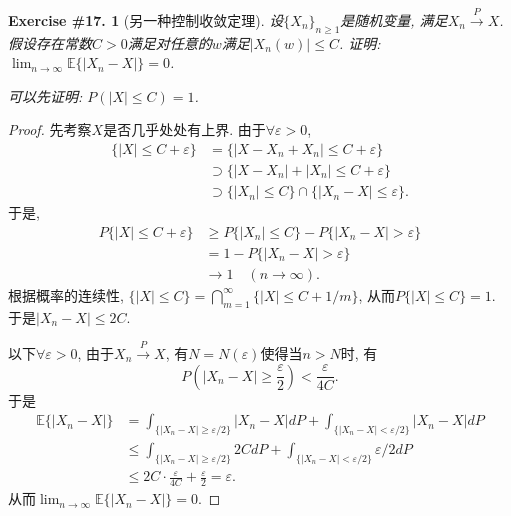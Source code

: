 \documentclass[UTF8, a4paper]{article}
\newtheorem{exercise}{Exercise \#17.}
\begin{document}
\begin{framed}
\begin{exercise}[另一种控制收敛定理]
设\(\{X_n\}_{n\geq 1}\)是随机变量, 满足\(X_n \overset{P}{\to} X\).
假设存在常数\(C>0\)满足对任意的\(w\)满足\(|X_n(w)| \leq C\).
证明: \(\lim_{n\to\infty} \mathbb{E}\{|X_n - X|\} = 0\).

可以先证明: \(P(|X| \leq C) = 1\).
\end{exercise}
\end{framed}



\begin{proof}
先考察\(X\)是否几乎处处有上界. 由于\(\forall \varepsilon > 0\),
$$
\begin{aligned}
    \{|X| \leq C + \varepsilon\} &= \{|X-X_n +X_n| \leq  C + \varepsilon\} \\
    &\supset \{|X-X_n| + |X_n| \leq C + \varepsilon\} \\
    &\supset \{|X_n| \leq C\} \cap \{|X_n - X| \leq \varepsilon\}.
\end{aligned}
$$
于是, 
\begin{align*}
    P\{|X| \leq C + \varepsilon\} &\geq P\{|X_n| \leq C\} - P\{|X_n - X| > \varepsilon\} \\
    & = 1 - P\{|X_n - X| > \varepsilon\} \\
    &\to 1 \quad (n\to \infty).
\end{align*}
根据概率的连续性, \(\{|X| \leq C\} = \bigcap_{m = 1}^\infty \{|X| \leq C + 1/m\}\), 从而\(P\{|X| \leq C\} = 1\). 于是\(|X_n - X| \leq 2C\).

以下\(\forall \varepsilon > 0\), 由于\(X_n \overset{P}{\to} X\), 有\(N = N(\varepsilon)\)使得当\(n > N\)时, 有
$$
P\left(|X_n - X| \geq \frac{\varepsilon}{2}\right) < \frac{\varepsilon}{4C}.
$$
于是
$$
\begin{aligned}
    \mathbb{E}\{|X_n - X|\} &= \int_{\{|X_n - X| \geq \varepsilon/2\}} |X_n - X| dP + \int_{\{|X_n - X| < \varepsilon/2\}} |X_n - X| dP \\
    &\leq \int_{\{|X_n - X| \geq \varepsilon/2\}} 2C dP + \int_{\{|X_n - X| < \varepsilon/2\}} \varepsilon/2 dP \\
    &\leq 2C \cdot \frac{\varepsilon}{4C} + \frac{\varepsilon}{2} = \varepsilon.
\end{aligned}
$$
从而\(\lim_{n\to\infty} \mathbb{E}\{|X_n - X|\} = 0\).
\end{proof}








\end{document}
